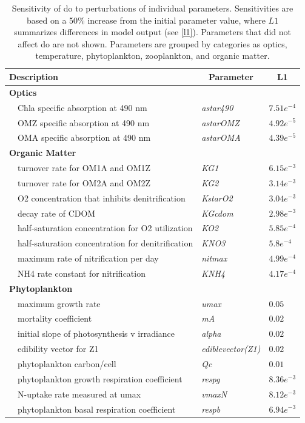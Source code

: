 \documentclass[review]{elsarticle}\usepackage[]{graphicx}\usepackage[]{color}
\begin{document}
\begin{table}[!tbp]
{\footnotesize
\caption{Sensitivity of \ac{do} to perturbations of individual parameters.  Sensitivities are based on a 50\% increase from the initial parameter value, where $L1$ summarizes differences in model output (see \cref{l1}).  Parameters that did not affect \ac{do} are not shown.  Parameters are grouped by categories as optics, temperature, phytoplankton, zooplankton, and organic matter.\label{tab:dosens}} 
\begin{center}
\begin{tabular}{lll}
\hline\hline
\multicolumn{1}{l}{Description}&\multicolumn{1}{c}{Parameter}&\multicolumn{1}{c}{L1}\tabularnewline
\hline
{\bfseries Optics}&&\tabularnewline
~~Chla specific absorption at 490 nm&\textit{astar490}&$7.51e^{-4}$\tabularnewline
~~OMZ specific absorption at 490 nm&\textit{astarOMZ}&$4.92e^{-5}$\tabularnewline
~~OMA specific absorption at 490 nm&\textit{astarOMA}&$4.39e^{-5}$\tabularnewline
\hline
{\bfseries Organic Matter}&&\tabularnewline
~~turnover rate for OM1A and OM1Z&\textit{KG1}&$6.15e^{-3}$\tabularnewline
~~turnover rate for OM2A and OM2Z&\textit{KG2}&$3.14e^{-3}$\tabularnewline
~~O2 concentration that inhibits denitrification&\textit{KstarO2}&$3.04e^{-3}$\tabularnewline
~~decay rate of CDOM&\textit{KGcdom}&$2.98e^{-3}$\tabularnewline
~~half-saturation concentration for O2 utilization&\textit{KO2}&$5.85e^{-4}$\tabularnewline
~~half-saturation concentration for denitrification&\textit{KNO3}&$5.8e^{-4}$\tabularnewline
~~maximum rate of nitrification per day&\textit{nitmax}&$4.99e^{-4}$\tabularnewline
~~NH4 rate constant for nitrification&\textit{KNH4}&$4.17e^{-4}$\tabularnewline
\hline
{\bfseries Phytoplankton}&&\tabularnewline
~~maximum growth rate&\textit{umax}&$0.05$\tabularnewline
~~mortality coefficient&\textit{mA}&$0.02$\tabularnewline
~~initial slope of photosynthesis v irradiance&\textit{alpha}&$0.02$\tabularnewline
~~edibility vector for Z1&\textit{ediblevector(Z1)}&$0.02$\tabularnewline
~~phytoplankton carbon/cell&\textit{Qc}&$0.01$\tabularnewline
~~phytoplankton growth respiration coefficient&\textit{respg}&$8.36e^{-3}$\tabularnewline
~~N-uptake rate measured at umax&\textit{vmaxN}&$8.12e^{-3}$\tabularnewline
~~phytoplankton basal respiration coefficient&\textit{respb}&$6.94e^{-3}$\tabularnewline

\end{tabular}
\end{center}}
\end{table}
\end{document}
